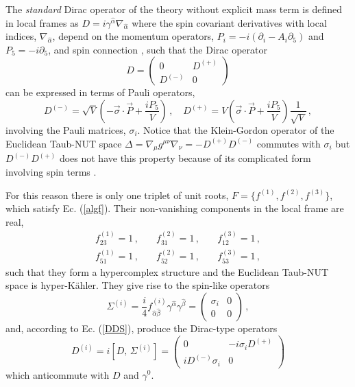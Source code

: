 \documentclass[a4paper,12pt]{article}
\begin{document}
The {\it standard} Dirac operator of the theory without explicit mass term 
is defined in local frames as 
${D}=i\gamma^{\hat\alpha}\nabla_{\hat\alpha}$  \cite{CV0,CV1}
where the spin covariant derivatives with local indices, 
$\nabla_{\hat\alpha}$, depend on the momentum operators,  
$P_{i}=-i(\partial_{i}-A_{i}\partial_{5})$ and $P_{5}=-i\partial_{5}$,
and spin connection \cite{CV0},  such that the  Dirac operator 
\begin{equation}\label{HH}
D =\left(
\begin{array}{cc}
0&D^{(+)}\\
D^{(-)}&0
\end{array}\right)
\end{equation}
can be expressed in terms of Pauli operators,  
\begin{equation}
D^{(-)}
=\sqrt{V}\left(- \vec{\sigma}\cdot\vec{P}+\frac{iP_{5}}{V}\right)\,,\quad  
D^{(+)} 
=V\left(\vec{\sigma}\cdot\vec{P}+\frac{iP_{5}}{V}\right)\frac{1}{\sqrt{V}}\,, 
\end{equation}
involving the Pauli matrices, $\sigma_i$. Notice that the Klein-Gordon operator 
of the Euclidean Taub-NUT space  $\Delta= \nabla_{\mu}g^{\mu\nu}\nabla_{\nu}=
-D^{(+)}D^{(-)}$ commutes with $\sigma_i$ but  $D^{(-)}D^{(+)}$ does not have 
this property because of its complicated form involving spin terms 
\cite{CV0,CV}. 

For this reason there is only one triplet of unit roots, $F=\{f^{(1)}, f^{(2)}, f^{(3)}\}$,   
which satisfy Ec. (\ref{algf}). Their non-vanishing components in the local 
frame are real,
\begin{eqnarray}
f^{(1)}_{23}=1\,,\quad&f^{(2)}_{31}=1\,,&\quad f^{(3)}_{12}=1\,,\\
f^{(1)}_{51}=1\,,\quad&f^{(2)}_{52}=1\,,&\quad f^{(3)}_{53}=1\,,
\end{eqnarray}
such that they form a hypercomplex structure and the Euclidean Taub-NUT space 
is
 hyper-K\"ahler. They give rise to the spin-like operators  
\begin{equation}\label{sl}
\Sigma^{(i)}=\frac{i}{4}f^{(i)}_{\hat\alpha\hat\beta}
\gamma^{\hat\alpha}\gamma^{\hat\beta}=\left(
\begin{array}{cc}
\sigma_i&0\\
0&0
\end{array}\right)\,,
\end{equation}
and, according to Ec. (\ref{DDS}), produce the  Dirac-type operators 
\cite{CV0}
\begin{equation}\label{Dto} 
D^{(i)}=i[D,\,\Sigma^{(i)}]=\left(
\begin{array}{cc}
0&-i\sigma_i D^{(+)}\\
iD^{(-)}\sigma_i&0
\end{array}\right)
\end{equation}
which anticommute with $D$ and $\gamma^0$. 
\end{document}
